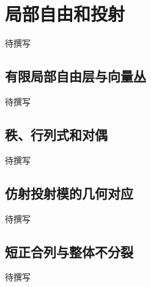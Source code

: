 
% 
% 

\section{局部自由和投射}
\label{g5:sec:1303}

待撰写

\subsection{有限局部自由层与向量丛}
\label{g5:subsec:1303:01}
待撰写

\subsection{秩、行列式和对偶}
\label{g5:subsec:1303:02}
待撰写

\subsection{仿射投射模的几何对应}
\label{g5:subsec:1303:03}
待撰写

\subsection{短正合列与整体不分裂}
\label{g5:subsec:1303:04}
待撰写
